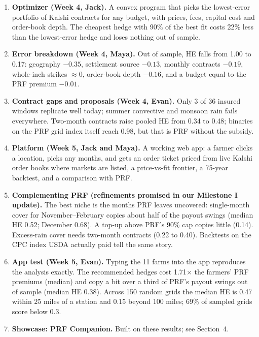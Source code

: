 \documentclass[11pt]{article}
\begin{document}
\begin{enumerate}
  \item \textbf{Optimizer (Week 4, Jack).} A convex program that picks the lowest-error portfolio of Kalshi
  contracts for any budget, with prices, fees, capital cost and order-book depth. The cheapest hedge with
  90\% of the best fit costs 22\% less than the lowest-error hedge and loses nothing out of sample.
  \item \textbf{Error breakdown (Week 4, Maya).} Out of sample, HE falls from 1.00 to 0.17:
  geography $-0.35$, settlement source $-0.13$, monthly contracts $-0.19$, whole-inch strikes $\approx 0$,
  order-book depth $-0.16$, and a budget equal to the PRF premium $-0.01$.
  \item \textbf{Contract gaps and proposals (Week 4, Evan).} Only 3 of 36 insured windows replicate well
  today; summer convective and monsoon rain fails everywhere. Two-month contracts raise pooled HE from
  0.34 to 0.48; binaries on the PRF grid index itself reach 0.98, but that is PRF without the subsidy.
  \item \textbf{Platform (Week 5, Jack and Maya).} A working web app: a farmer clicks a location, picks any
  months, and gets an order ticket priced from live Kalshi order books where markets are listed, a
  price-vs-fit frontier, a 75-year backtest, and a comparison with PRF.
  \item \textbf{Complementing PRF (refinements promised in our Milestone I update).} The best niche is the
  months PRF leaves uncovered: single-month cover for November--February copies about half of the payout
  swings (median HE 0.52; December 0.68). A top-up above PRF's 90\% cap copies little (0.14). Excess-rain
  cover needs two-month contracts (0.22 to 0.40). Backtests on the CPC index USDA actually paid tell the same story.
  \item \textbf{App test (Week 5, Evan).} Typing the 11 farms into the app reproduces the analysis exactly. The
  recommended hedges cost 1.71$\times$ the farmers' PRF premiums (median) and copy a bit over a third of PRF's
  payout swings out of sample (median HE 0.38). Across 150 random grids the median HE is 0.47 within 25 miles
  of a station and 0.15 beyond 100 miles; 69\% of sampled grids score below 0.3.
  \item \textbf{Showcase: PRF Companion.} Built on these results; see Section~4.
\end{enumerate}

\end{document}
